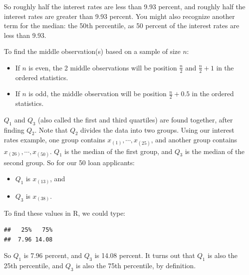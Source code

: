 \documentclass[
]{book}
\newenvironment{Shaded}{\begin{snugshade}}{\end{snugshade}}
\newcommand{\AttributeTok}[1]{\textcolor[rgb]{0.13,0.29,0.53}{#1}}
\newcommand{\DecValTok}[1]{\textcolor[rgb]{0.00,0.00,0.81}{#1}}
\newcommand{\FloatTok}[1]{\textcolor[rgb]{0.00,0.00,0.81}{#1}}
\newcommand{\FunctionTok}[1]{\textcolor[rgb]{0.13,0.29,0.53}{\textbf{#1}}}
\newcommand{\NormalTok}[1]{#1}
\newcommand{\SpecialCharTok}[1]{\textcolor[rgb]{0.81,0.36,0.00}{\textbf{#1}}}
\providecommand{\tightlist}{%
  \setlength{\itemsep}{0pt}\setlength{\parskip}{0pt}}
\begin{document}
So roughly half the interest rates are less than 9.93 percent, and roughly half the interest rates are greater than 9.93 percent. You might also recognize another term for the median: the 50th percentile, as 50 percent of the interest rates are less than 9.93.

To find the middle observation(s) based on a sample of size \(n\):

\begin{itemize}
\tightlist
\item
  If \(n\) is even, the 2 middle observations will be position \(\frac{n}{2}\) and \(\frac{n}{2} + 1\) in the ordered statistics.
\item
  If \(n\) is odd, the middle observation will be position \(\frac{n}{2} + 0.5\) in the ordered statistics.
\end{itemize}

\(Q_1\) and \(Q_3\) (also called the first and third quartiles) are found together, after finding \(Q_2\). Note that \(Q_2\) divides the data into two groups. Using our interest rates example, one group contains \(x_{(1)}, \cdots, x_{(25)}\), and another group contains \(x_{(26)}, \cdots, x_{(50)}\). \(Q_1\) is the median of the first group, and \(Q_3\) is the median of the second group. So for our 50 loan applicants:

\begin{itemize}
\tightlist
\item
  \(Q_1\) is \(x_{(13)}\), and
\item
  \(Q_3\) is \(x_{(38)}\).
\end{itemize}

To find these values in R, we could type:

\begin{Shaded}
\end{Shaded}

\begin{verbatim}
##   25%   75% 
##  7.96 14.08
\end{verbatim}

So \(Q_1\) is 7.96 percent, and \(Q_3\) is 14.08 percent. It turns out that \(Q_1\) is also the 25th percentile, and \(Q_3\) is also the 75th percentile, by definition.
\end{document}
